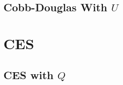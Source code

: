 \documentclass[preprint,authoryear,12pt]{elsarticle}\usepackage{graphicx, color}
\begin{document}
\subsection{Cobb-Douglas With $U$}







\section{CES}




\subsection{CES with $Q$}








\end{document}
